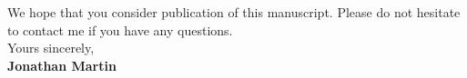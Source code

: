 \documentclass[11pt]{article}
\begin{document}
\par We hope that you consider publication of this manuscript.
Please do not hesitate to contact me if you have any questions.\\[1.5em]
% 
Yours sincerely,\\[2em] %
%
{\bfseries Jonathan Martin}\\
%
\vfill%
\end{document}
